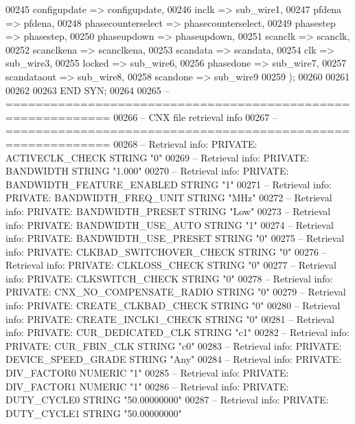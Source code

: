 \begin{DoxyCode}
{00245         configupdate => configupdate,
00246         inclk => sub_wire1,
00247         pfdena => pfdena,
00248         phasecounterselect => phasecounterselect,
00249         phasestep => phasestep,
00250         phaseupdown => phaseupdown,
00251         scanclk => scanclk,
00252         scanclkena => scanclkena,
00253         scandata => scandata,
00254         clk => sub_wire3,
00255         locked => sub_wire6,
00256         phasedone => sub_wire7,
00257         scandataout => sub_wire8,
00258         scandone => sub_wire9
00259     \textcolor{vhdlchar}{)};
00260 
00261 
00262 
00263 \textcolor{keywordflow}{END} \textcolor{vhdlchar}{SYN};
00264 
00265 \textcolor{keyword}{-- ============================================================}
00266 \textcolor{keyword}{-- CNX file retrieval info}
00267 \textcolor{keyword}{-- ============================================================}
00268 \textcolor{keyword}{-- Retrieval info: PRIVATE: ACTIVECLK\_CHECK STRING "0"}
00269 \textcolor{keyword}{-- Retrieval info: PRIVATE: BANDWIDTH STRING "1.000"}
00270 \textcolor{keyword}{-- Retrieval info: PRIVATE: BANDWIDTH\_FEATURE\_ENABLED STRING "1"}
00271 \textcolor{keyword}{-- Retrieval info: PRIVATE: BANDWIDTH\_FREQ\_UNIT STRING "MHz"}
00272 \textcolor{keyword}{-- Retrieval info: PRIVATE: BANDWIDTH\_PRESET STRING "Low"}
00273 \textcolor{keyword}{-- Retrieval info: PRIVATE: BANDWIDTH\_USE\_AUTO STRING "1"}
00274 \textcolor{keyword}{-- Retrieval info: PRIVATE: BANDWIDTH\_USE\_PRESET STRING "0"}
00275 \textcolor{keyword}{-- Retrieval info: PRIVATE: CLKBAD\_SWITCHOVER\_CHECK STRING "0"}
00276 \textcolor{keyword}{-- Retrieval info: PRIVATE: CLKLOSS\_CHECK STRING "0"}
00277 \textcolor{keyword}{-- Retrieval info: PRIVATE: CLKSWITCH\_CHECK STRING "0"}
00278 \textcolor{keyword}{-- Retrieval info: PRIVATE: CNX\_NO\_COMPENSATE\_RADIO STRING "0"}
00279 \textcolor{keyword}{-- Retrieval info: PRIVATE: CREATE\_CLKBAD\_CHECK STRING "0"}
00280 \textcolor{keyword}{-- Retrieval info: PRIVATE: CREATE\_INCLK1\_CHECK STRING "0"}
00281 \textcolor{keyword}{-- Retrieval info: PRIVATE: CUR\_DEDICATED\_CLK STRING "c1"}
00282 \textcolor{keyword}{-- Retrieval info: PRIVATE: CUR\_FBIN\_CLK STRING "c0"}
00283 \textcolor{keyword}{-- Retrieval info: PRIVATE: DEVICE\_SPEED\_GRADE STRING "Any"}
00284 \textcolor{keyword}{-- Retrieval info: PRIVATE: DIV\_FACTOR0 NUMERIC "1"}
00285 \textcolor{keyword}{-- Retrieval info: PRIVATE: DIV\_FACTOR1 NUMERIC "1"}
00286 \textcolor{keyword}{-- Retrieval info: PRIVATE: DUTY\_CYCLE0 STRING "50.00000000"}
00287 \textcolor{keyword}{-- Retrieval info: PRIVATE: DUTY\_CYCLE1 STRING "50.00000000"}
}
\end{DoxyCode}
